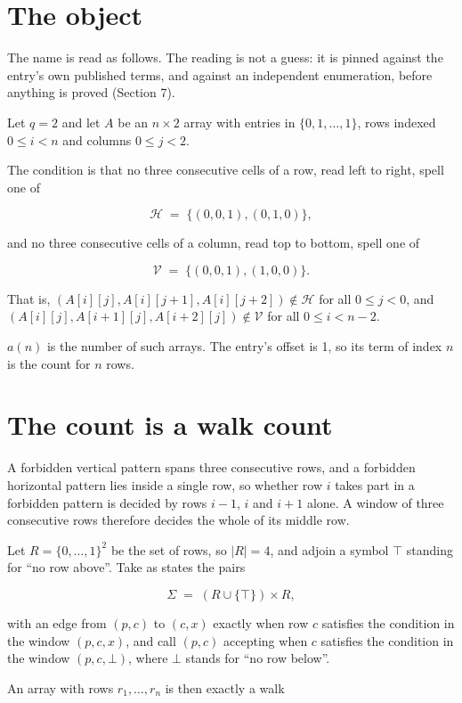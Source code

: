 \documentclass[11pt]{article}
\theoremstyle{definition}
\begin{document}
\section{The object}

The name is read as follows. The reading is not a guess: it is pinned against the entry's own published terms, and against an independent enumeration, before anything is proved (Section 7).

Let $q = 2$ and let $A$ be an $n \times 2$ array with entries in $\{0,1,\dots,1\}$, rows indexed $0 \le i < n$ and columns $0 \le j < 2$.

The condition is that no three consecutive cells of a row, read left to right, spell one of

\[\mathcal{H} \;=\; \{(0,0,1), (0,1,0)\},\]

and no three consecutive cells of a column, read top to bottom, spell one of

\[\mathcal{V} \;=\; \{(0,0,1), (1,0,0)\}.\]

That is, $(A[i][j],A[i][j{+}1],A[i][j{+}2]) \notin \mathcal{H}$ for all $0 \le j < 0$, and $(A[i][j],A[i{+}1][j],A[i{+}2][j]) \notin \mathcal{V}$ for all $0 \le i < n-2$.

$a(n)$ is the number of such arrays. The entry's offset is 1, so its term of index $n$ is the count for $n$ rows.

\section{The count is a walk count}

A forbidden vertical pattern spans three consecutive rows, and a forbidden horizontal pattern lies inside a single row, so whether row $i$ takes part in a forbidden pattern is decided by rows $i-1$, $i$ and $i+1$ alone. A window of three consecutive rows therefore decides the whole of its middle row.

Let $R = \{0,\dots,1\}^{2}$ be the set of rows, so $|R| = 4$, and adjoin a symbol $\top$ standing for ``no row above''. Take as states the pairs

\[\Sigma \;=\; (R \cup \{\top\}) \times R,\]

with an edge from $(p,c)$ to $(c,x)$ exactly when row $c$ satisfies the condition in the window $(p,c,x)$, and call $(p,c)$ accepting when $c$ satisfies the condition in the window $(p,c,\bot)$, where $\bot$ stands for ``no row below''.

An array with rows $r_1,\dots,r_n$ is then exactly a walk
\end{document}
